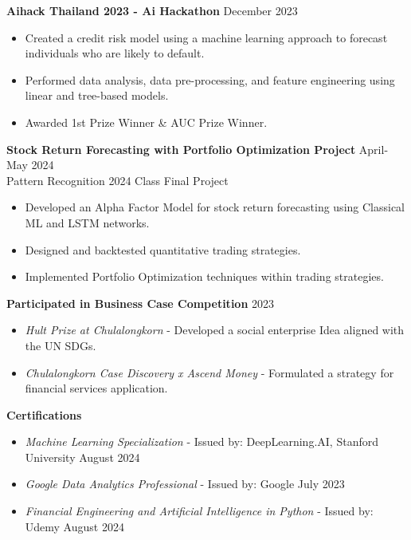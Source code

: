 \documentclass[11pt]{article}
\begin{document}
\textbf{Aihack Thailand 2023 - Ai Hackathon} \hfill December 2023
\begin{itemize}[noitemsep, topsep=0pt, partopsep=0pt, parsep=0pt]
    \item Created a credit risk model using a machine learning approach to forecast individuals who are likely to default.
    \item Performed data analysis, data pre-processing, and feature engineering using linear and tree-based models.
    \item Awarded 1st Prize Winner \& AUC Prize Winner.
\end{itemize}

\vspace{3pt}

\textbf{Stock Return Forecasting with Portfolio Optimization Project} \hfill April-May 2024 \\
{\footnotesize Pattern Recognition 2024 Class Final Project}
\begin{itemize}[noitemsep, topsep=0pt, partopsep=0pt, parsep=0pt]
    \item Developed an Alpha Factor Model for stock return forecasting using Classical ML and LSTM networks.
    \item Designed and backtested quantitative trading strategies.
    \item Implemented Portfolio Optimization techniques within trading strategies.
\end{itemize}

\vspace{3pt}

\textbf{Participated in Business Case Competition} \hfill 2023
\begin{itemize}[noitemsep, topsep=0pt, partopsep=0pt, parsep=0pt]
    \item \textit{Hult Prize at Chulalongkorn} - Developed a social enterprise Idea aligned with the UN SDGs.
    \item \textit{Chulalongkorn Case Discovery x Ascend Money} - Formulated a strategy for financial services application.
\end{itemize}

\vspace{3pt}

\textbf{Certifications}
\begin{itemize}[noitemsep, topsep=0pt, partopsep=0pt, parsep=0pt]
    \item \textit{Machine Learning Specialization} - Issued by: DeepLearning.AI, Stanford University \hfill August 2024
    \item \textit{Google Data Analytics Professional} - Issued by: Google \hfill July 2023
    \item \textit{Financial Engineering and Artificial Intelligence in Python} - Issued by: Udemy \hfill August 2024
\end{itemize}
\end{document}
